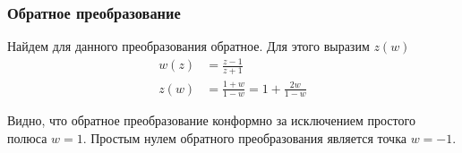\begin{frame}\frametitle{Обратное преобразование}
  Найдем для данного преобразования обратное.
  Для этого выразим \(z(w)\)
  \begin{align*}
    w(z) &= \frac{z-1}{z+1} \\
    z(w) &= \frac{1+w}{1-w} = 1 + \frac{2w}{1-w}
  \end{align*}

  Видно, что обратное преобразование конформно за исключением
  простого полюса \(w = 1\). 
  Простым нулем обратного преобразования является точка \(w = -1\).
\end{frame}
